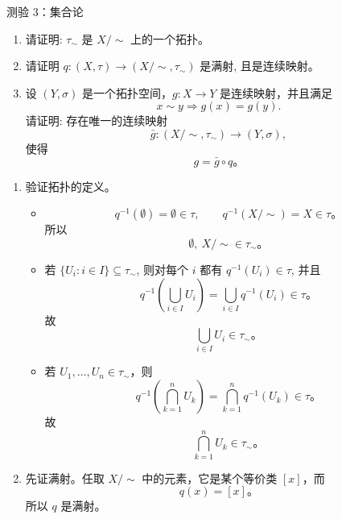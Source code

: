 \begin{frame}[allowframebreaks]{测验 3：集合论}
\begin{problem}
  \begin{enumerate}[(1)]
    \item 请证明: $\tau_{\sim}$ 是 $X/\sim$ 上的一个拓扑。
    \item 请证明 $q: (X, \tau) \to (X/\sim, \tau_{\sim})$
      是满射, 且是连续映射。
    \item 设 $(Y, \sigma)$ 是一个拓扑空间，$g: X \to Y$ 是连续映射，并且满足
      \[
        x \sim y \Rightarrow g(x) = g(y).
      \]
      请证明: 存在唯一的连续映射
      \[
        \bar{g}: (X/\sim, \tau_{\sim}) \to (Y, \sigma),
      \]
      使得
      \[
        g = \bar{g} \circ q\text{。}
      \]
  \end{enumerate}
\end{problem}

\begin{solution}
  \begin{enumerate}[(1)]
    \item 验证拓扑的定义。
      \begin{itemize}
        \item
          \[
            q^{-1}(\emptyset)=\emptyset\in \tau,
            \qquad
            q^{-1}(X/{\sim})=X\in \tau\text{。}
          \]
          所以
          \[
            \emptyset,\ X/{\sim}\in \tau_{\sim}\text{。}
          \]
        \item 若 $\{U_i: i \in I\} \subseteq \tau_{\sim}$,
          则对每个 $i$ 都有 $q^{-1}(U_i) \in \tau$, 并且
          \[
            q^{-1}\!\left(\bigcup_{i\in I}U_i\right)
            =
            \bigcup_{i\in I}q^{-1}(U_i) \in \tau\text{。}
          \]
          故
          \[
            \bigcup_{i\in I}U_i\in \tau_{\sim}\text{。}
          \]
        \item 若 $U_1,\dots,U_n\in \tau_{\sim}$，则
          \[
            q^{-1}\!\left(\bigcap_{k=1}^{n}U_k\right)
            =
            \bigcap_{k=1}^{n}q^{-1}(U_k) \in \tau\text{。}
          \]
          故
          \[
            \bigcap_{k=1}^{n}U_k\in \tau_{\sim}\text{。}
          \]
      \end{itemize}
    \item 先证满射。任取 $X/{\sim}$ 中的元素，它是某个等价类 $[x]$，而
      \[
        q(x) = [x]\text{。}
      \]
      所以 $q$ 是满射。


\end{enumerate}
\end{solution}
\end{frame}
